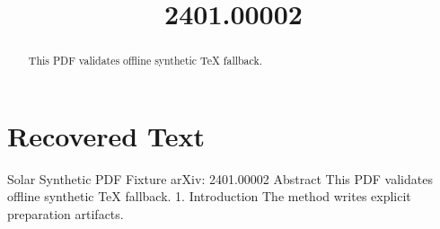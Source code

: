 \title{2401.00002}

\maketitle

\begin{abstract}
This PDF validates offline synthetic TeX fallback.
\end{abstract}

\section{Recovered Text}
Solar Synthetic PDF Fixture
arXiv: 2401.00002
Abstract
This PDF validates offline synthetic TeX fallback.
1. Introduction
The method writes explicit preparation artifacts.

